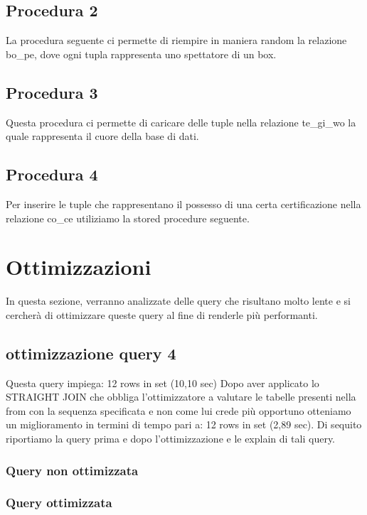 \documentclass[12pt,a4paper]{article}
\begin{document}
\subsection{Procedura 2}
La procedura seguente ci permette di riempire in maniera random la relazione bo\_pe, dove ogni tupla rappresenta uno spettatore di un box.

\subsection{Procedura 3}
Questa procedura ci permette di caricare delle tuple nella relazione te\_gi\_wo la quale rappresenta il cuore della base di dati.

\subsection{Procedura 4}
Per inserire le tuple che rappresentano il possesso di una certa certificazione nella relazione co\_ce utiliziamo la stored procedure seguente.

\newpage
\section{Ottimizzazioni}
In questa sezione, verranno analizzate delle query che risultano molto lente e si cercherà di ottimizzare queste query al fine di renderle più performanti.
\subsection{ottimizzazione query 4}
Questa query impiega: 12 rows in set (10,10 sec)
Dopo aver applicato lo STRAIGHT JOIN che obbliga l'ottimizzatore a valutare le tabelle presenti nella from con la sequenza specificata e non come lui crede più opportuno otteniamo un miglioramento in termini di tempo pari a: 12 rows in set (2,89 sec). Di sequito riportiamo la query prima e dopo l'ottimizzazione e le explain di tali query.
\subsubsection{Query non ottimizzata}

\subsubsection{Query ottimizzata}

\end{document}
